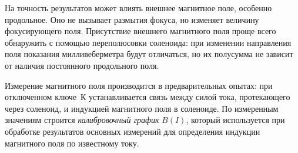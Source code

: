 На точность результатов может влиять внешнее магнитное поле, особенно
продольное. Оно не вызывает размытия фокуса, но изменяет величину фокусирующего
поля. Присутствие внешнего магнитного поля проще всего обнаружить с помощью
переполюсовки соленоида: при изменении направления поля показания
милливеберметра будут отличаться, но их полусумма не зависит от наличия
постоянного продольного поля.

Измерение магнитного поля производится в предварительных опытах: 
при отключенном ключе~К устанавливается связь между силой тока, протекающего 
через соленоид, и индукцией магнитного поля в соленоиде. 
По измеренным значениям строится \emph{калибровочный график} $B(I)$, 
который используется при обработке результатов
основных измерений для определения индукции магнитного поля по известному току.

